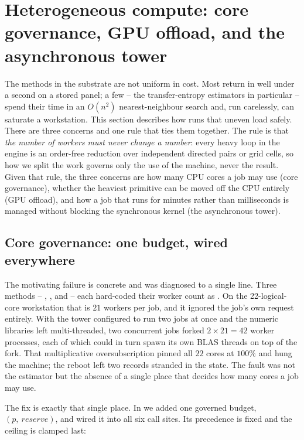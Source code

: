 \section{Heterogeneous compute: core governance, GPU offload, and the asynchronous tower}
\label{sec:heterogeneous}

The methods in the substrate are not uniform in cost. Most return in well under a
second on a stored panel; a few -- the transfer-entropy estimators in particular --
spend their time in an $O(n^2)$ nearest-neighbour search and, run carelessly, can
saturate a workstation. This section describes how \engine{} runs that uneven load
safely. There are three concerns and one rule that ties them together. The rule is
that \emph{the number of workers must never change a number}: every heavy loop in the
engine is an order-free reduction over independent directed pairs or grid cells, so
how we split the work governs only the use of the machine, never the result. Given
that rule, the three concerns are how many CPU cores a job may use (core governance),
whether the heaviest primitive can be moved off the CPU entirely (GPU offload), and
how a job that runs for minutes rather than milliseconds is managed without blocking
the synchronous kernel (the asynchronous tower).

\subsection{Core governance: one budget, wired everywhere}
\label{sec:core-governance}

The motivating failure is concrete and was diagnosed to a single line. Three methods
-- , , and  -- each
hard-coded their worker count as . On the
22-logical-core workstation that is $21$  workers per job, and it
ignored the job's own  request entirely. With the tower configured to
run two jobs at once and the numeric libraries left multi-threaded, two concurrent
 jobs forked $2 \times 21 = 42$ worker processes, each of
which could in turn spawn its own BLAS threads on top of the fork. That multiplicative
oversubscription pinned all $22$ cores at $100\%$ and hung the machine; the reboot
left two  records stranded in the  state. The
fault was not the estimator but the absence of a single place that decides how many
cores a job may use.

The fix is exactly that single place. In  we added one governed
budget, $(p,\ \mathit{reserve})$, and wired it into all six
 call sites. Its precedence is fixed and the ceiling is clamped last:

